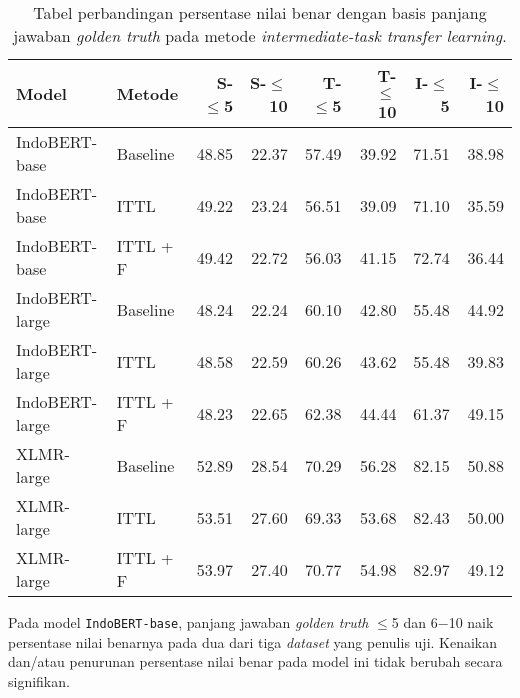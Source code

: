 \begin{table}[H]\centering
\begin{tabular}{llrrrrrr}
\toprule
         Model &   Metode &  S-$\leq$5 &  S-$\leq$10 &  T-$\leq$5 &  T-$\leq$10 &  I-$\leq$5 &  I-$\leq$10 \\
\midrule
 IndoBERT-base & Baseline &                48.85 &                 22.37 &                57.49 &                 39.92 &                71.51 &                 38.98 \\
 IndoBERT-base &     ITTL &                49.22 &                 23.24 &                56.51 &                 39.09 &                71.10 &                 35.59 \\
 IndoBERT-base & ITTL + F &                49.42 &                 22.72 &                56.03 &                 41.15 &                72.74 &                 36.44 \\
\hline
IndoBERT-large & Baseline &                48.24 &                 22.24 &                60.10 &                 42.80 &                55.48 &                 44.92 \\
IndoBERT-large &     ITTL &                48.58 &                 22.59 &                60.26 &                 43.62 &                55.48 &                 39.83 \\
IndoBERT-large & ITTL + F &                48.23 &                 22.65 &                62.38 &                 44.44 &                61.37 &                 49.15 \\
\hline
    XLMR-large & Baseline &                52.89 &                 28.54 &                70.29 &                 56.28 &                82.15 &                 50.88 \\
    XLMR-large &     ITTL &                53.51 &                 27.60 &                69.33 &                 53.68 &                82.43 &                 50.00 \\
    XLMR-large & ITTL + F &                53.97 &                 27.40 &                70.77 &                 54.98 &                82.97 &                 49.12 \\
\bottomrule
\end{tabular}
\caption{Tabel perbandingan persentase nilai benar dengan basis panjang jawaban \emph{golden truth} pada metode \emph{intermediate-task transfer learning}.}
\end{table}

Pada model \texttt{IndoBERT-base}, panjang jawaban \emph{golden truth} $\leq$5 dan 6$-$10 naik persentase nilai benarnya pada dua dari tiga \emph{dataset} yang penulis uji. Kenaikan dan/atau penurunan persentase nilai benar pada model ini tidak berubah secara signifikan.

